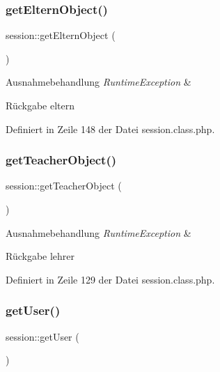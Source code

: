 \subsubsection{\texorpdfstring{get\+Eltern\+Object()}{getElternObject()}}
{\footnotesize\ttfamily session\+::get\+Eltern\+Object (\begin{DoxyParamCaption}{ }\end{DoxyParamCaption})}


\begin{DoxyExceptions}{Ausnahmebehandlung}
{\em Runtime\+Exception} & \\
\hline
\end{DoxyExceptions}
\begin{DoxyReturn}{Rückgabe}
eltern 
\end{DoxyReturn}


Definiert in Zeile 148 der Datei session.\+class.\+php.

\mbox{\label{classsession_ad84474cda1ebf612eccfdd1c8a28c819}} 
\subsubsection{\texorpdfstring{get\+Teacher\+Object()}{getTeacherObject()}}
{\footnotesize\ttfamily session\+::get\+Teacher\+Object (\begin{DoxyParamCaption}{ }\end{DoxyParamCaption})}


\begin{DoxyExceptions}{Ausnahmebehandlung}
{\em Runtime\+Exception} & \\
\hline
\end{DoxyExceptions}
\begin{DoxyReturn}{Rückgabe}
lehrer 
\end{DoxyReturn}


Definiert in Zeile 129 der Datei session.\+class.\+php.

\mbox{\label{classsession_a57dc997b9bbd925538bb15cc5fa2b0a8}} 
\subsubsection{\texorpdfstring{get\+User()}{getUser()}}
{\footnotesize\ttfamily session\+::get\+User (\begin{DoxyParamCaption}{ }\end{DoxyParamCaption})}

